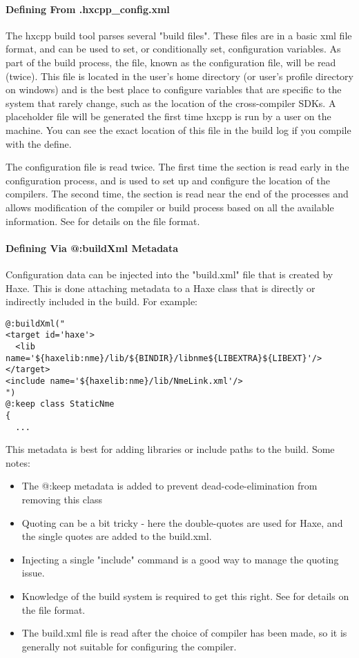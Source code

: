 \paragraph{Defining From .hxcpp_config.xml}
The hxcpp build tool parses several "build files".  These files are in a basic xml file format, and can be used to set, or conditionally set, configuration variables.  As part of the build process, the  file, known as the configuration file, will be read (twice).  This file is located in the user's home directory (or user's profile directory on windows) and is the best place to configure variables that are specific to the system that rarely change, such as the location of the cross-compiler SDKs.  A placeholder file will be generated the first time hxcpp is run by a user on the machine.  You can see the exact location of this file in the build log if you compile with the  define.

The configuration file is read twice.  The first time the  section is read early in the configuration process, and is used to set up and configure the location of the compilers.  The second time, the  section is read near the end of the processes and allows modification of the compiler or build process based on all the available information.  See  for details on the file format.

\paragraph{Defining Via @:buildXml Metadata}
Configuration data can be injected into the "build.xml" file that is created by Haxe.  This is done attaching metadata to a Haxe class that is directly or indirectly included in the build.  For example:
\begin{lstlisting}
@:buildXml("
<target id='haxe'>
  <lib name='${haxelib:nme}/lib/${BINDIR}/libnme${LIBEXTRA}${LIBEXT}'/>
</target>
<include name='${haxelib:nme}/lib/NmeLink.xml'/>
")
@:keep class StaticNme
{
  ...
\end{lstlisting}

This metadata is best for adding libraries or include paths to the build.
Some notes:
\begin{itemize}
	\item The @:keep metadata is added to prevent dead-code-elimination from removing this class
	\item Quoting can be a bit tricky - here the double-quotes are used for Haxe, and the single quotes are added to the build.xml.
	\item Injecting a single "include" command is a good way to manage the quoting issue.
	\item Knowledge of the build system is required to get this right. See  for details on the file format.
	\item The build.xml file is read after the choice of compiler has been made, so it is generally not suitable for configuring the compiler.
\end{itemize}


